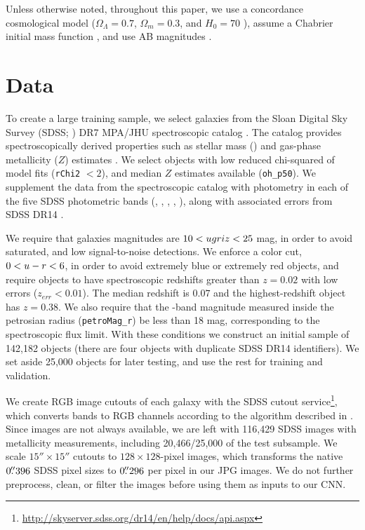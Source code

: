 \documentclass[fleqn,usenatbib]{mnras}
\begin{document}
Unless otherwise noted, throughout this paper, we use a concordance cosmological model ($\Omega_\Lambda = 0.7$, $\Omega_m = 0.3$, and $H_0= 70$ \kms{} \permpc), assume a Chabrier initial mass function \citep{Chabrier2003}, and use AB magnitudes \citep{Oke1974}.


\section{Data} \label{sec:data}
To create a large training sample, we select galaxies from the Sloan Digital Sky Survey (SDSS; \citealt{York2000}) DR7 MPA/JHU spectroscopic catalog \citep{Kauffmann2003a, Brinchmann2004, Tremonti2004, Salim2007}. The catalog provides spectroscopically derived properties such as stellar mass (\mstar) and gas-phase metallicity ($Z$) estimates \citep{Tremonti2004}. We select objects with low reduced chi-squared of model fits (\texttt{rChi2} $< 2$), and median $Z$ estimates available (\texttt{oh\_p50}). We supplement the data from the spectroscopic catalog with photometry in each of the five SDSS photometric bands (\sdssu, \sdssg, \sdssr, \sdssi, \sdssz), along with associated errors from SDSS DR14 \citep{Abolfathi2017}.

We require that galaxies magnitudes are $10 < \hbox{$u$} \hbox{$g$} \hbox{$r$} \hbox{$i$} \hbox{$z$} < 25$ mag, in order to avoid saturated, and low signal-to-noise detections. We enforce a color cut, $0 < \hbox{$u$}-\hbox{$r$} < 6$, in order to avoid extremely blue or extremely red objects, and require objects to have spectroscopic redshifts greater than $z=0.02$ with low errors ($z_{err} < 0.01$). The median redshift is $0.07$ and the highest-redshift object has $z = 0.38$. We also require that the \sdssr-band magnitude measured inside the petrosian radius (\texttt{petroMag\_r}) be less than 18 mag, corresponding to the spectroscopic flux limit.
With these conditions we construct an initial sample of 142,182 objects (there are four objects with duplicate SDSS DR14 identifiers).
We set aside 25,000 objects for later testing, and use the rest for training and validation.

We create RGB image cutouts of each galaxy with the SDSS cutout service\footnote{\url{http://skyserver.sdss.org/dr14/en/help/docs/api.aspx}}, which converts \sdssi\sdssr\sdssg{} bands to RGB channels according to the algorithm described in \cite[][with modifications by the SDSS SkyServer team]{Lupton2004}. Since images are not always available, we are left with 116,429 SDSS images with metallicity measurements, including 20,466/25,000 of the test subsample. We scale $15''\times15''$ cutouts to $128\times128$-pixel images, which transforms the native $0\hbox{$.\!\!^{\prime\prime}$}396$ SDSS pixel sizes to $0\hbox{$.\!\!^{\prime\prime}$}296$ per pixel in our JPG images. We do not further preprocess, clean, or filter the images before using them as inputs to our CNN.
\end{document}
